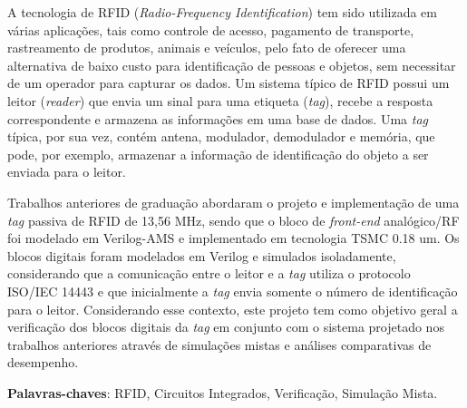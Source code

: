 \begin{resumo}



A tecnologia de RFID (\textit{Radio-Frequency Identification}) tem sido utilizada em várias aplicações, tais como controle de acesso, pagamento de transporte, rastreamento de produtos, animais e veículos, pelo fato de oferecer uma alternativa de baixo custo para identificação de pessoas e objetos, sem necessitar de um operador para capturar os dados. Um sistema típico de RFID possui um leitor (\textit{reader}) que envia um sinal para uma etiqueta (\textit{tag}), recebe a resposta correspondente e armazena as informações em uma base de dados. Uma \textit{tag} típica, por sua vez, contém antena, modulador, demodulador e memória, que pode, por exemplo, armazenar a informação de identificação do objeto a ser enviada para o leitor.

Trabalhos anteriores de graduação abordaram o projeto e implementação de uma \textit{tag} passiva de RFID de 13,56 MHz, sendo que o bloco de \textit{front-end} analógico/RF foi modelado em Verilog-AMS e implementado em  tecnologia TSMC 0.18 um. Os blocos digitais foram modelados em Verilog e simulados isoladamente, considerando que a comunicação entre o leitor e a \textit{tag} utiliza o protocolo ISO/IEC 14443 e que inicialmente a \textit{tag} envia somente o número de identificação para o leitor. Considerando esse contexto, este projeto tem como objetivo geral a verificação dos blocos digitais da \textit{tag} em conjunto com o sistema projetado nos trabalhos anteriores através de simulações mistas e análises comparativas de desempenho.

 \vspace{\onelineskip}
    
 \noindent
 \textbf{Palavras-chaves}: RFID, Circuitos Integrados, Verificação, Simulação Mista.
\end{resumo}
